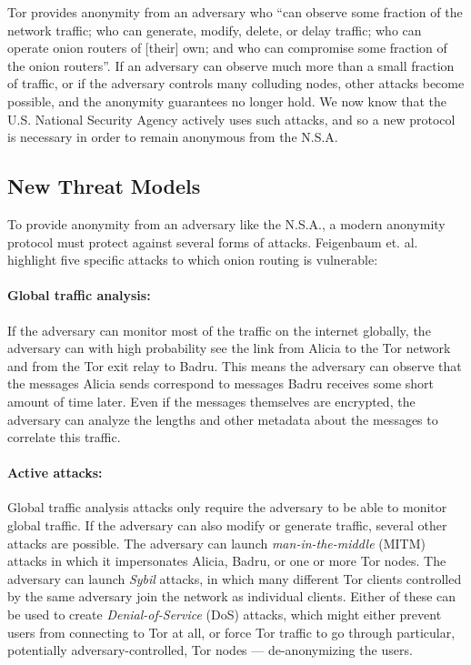     Tor provides anonymity from an adversary who ``can observe some fraction of
    the network traffic; who can generate, modify, delete, or delay traffic; who
    can operate onion routers of [their] own; and who can compromise some
    fraction of the onion routers''\cite{dingledine_tor:_2004}. If an adversary
    can observe much more than a small fraction of traffic, or if the adversary
    controls many colluding nodes, other attacks become possible, and the
    anonymity guarantees no longer hold. We now know that the U.S. National
    Security Agency actively uses such attacks, and so a new protocol is
    necessary in order to remain anonymous from the N.S.A.

  \subsection{New Threat Models}
  \label{Subsubsection:NewThreats} To
    provide anonymity from an adversary like the N.S.A., a modern anonymity
    protocol must protect against several forms of attacks. Feigenbaum et.
    al.\cite{feigenbaum_seeking_2013} highlight five specific attacks to which
    onion routing is vulnerable:
    \paragraph{Global traffic analysis:} If the
    adversary can monitor most of the traffic on the internet globally, the
    adversary can with high probability see the link from Alicia to the Tor
    network and from the Tor exit relay to Badru. This means the adversary can
    observe that the messages Alicia sends correspond to messages Badru receives
    some short amount of time later. Even if the messages themselves are
    encrypted, the adversary can analyze the lengths and other metadata about
    the messages to correlate this traffic.
    \paragraph{Active attacks:}
    Global traffic analysis attacks only require the adversary to be able to
    monitor global traffic. If the adversary can also modify or generate
    traffic, several other attacks are possible. The adversary can launch
    \emph{man-in-the-middle} (MITM) attacks in which it impersonates Alicia,
    Badru, or one or more Tor nodes. The adversary can launch \emph{Sybil}
    attacks, in which many different Tor clients controlled by the same
    adversary join the network as individual clients. Either of these can be
    used to create \emph{Denial-of-Service} (DoS) attacks, which might either
    prevent users from connecting to Tor at all, or force Tor traffic to go
    through particular, potentially adversary-controlled, Tor nodes ---
    de-anonymizing the users.

